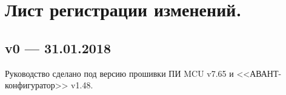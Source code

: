 \section*{Лист регистрации изменений.}

\subsection*{v0 --- 31.01.2018}

Руководство сделано под версию прошивки ПИ MCU v7.65 и <<АВАНТ-конфигуратор>> v1.48. 